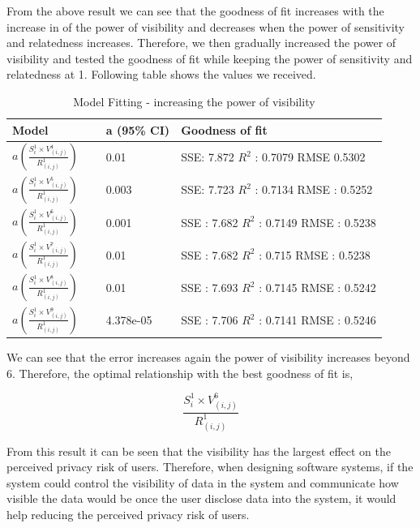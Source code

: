 \documentclass[conference]{IEEEtran}
\begin{document}
From the above result we can see that the goodness of fit increases with the increase in of the power of visibility and decreases when the power of sensitivity and relatedness increases. Therefore, we then gradually increased the power of visibility and tested the goodness of fit while keeping the power of sensitivity and relatedness at 1. Following table shows the values we received.
\begin{center}
\begin{table}[htbp]
\caption{Model Fitting - increasing the power of visibility}
\begin{center}
\begin{adjustbox}{width=0.5\textwidth} 
\begin{tabular}{|p{0.25\linewidth}|p{0.2\linewidth}|p{0.55\linewidth}|} 
\hline
Model & a (95\% CI) & Goodness of fit\\
\hline
 $a(  \frac{S_{i}^1 \times V_{(i,j)}^4}{R_{(i,j)}^1})$ & 0.01 &  SSE: 7.872   $R^2$ : 0.7079  RMSE 0.5302\\
\hline
 $a(  \frac{S_{i}^1 \times V_{(i,j)}^5}{R_{(i,j)}^1}) $ & 0.003 & SSE: 7.723 $R^2$ : 0.7134  RMSE : 0.5252 \\
\hline
$a(  \frac{S_{i}^1 \times V_{(i,j)}^6}{R_{(i,j)}^1})$ & 0.001 & SSE : 7.682  $R^2$ : 0.7149  RMSE : 0.5238 \\
\hline
$a(  \frac{S_{i}^1 \times V_{(i,j)}^7}{R_{(i,j)}^1})$ & 0.01 &   SSE : 7.682  $R^2$ : 0.715  RMSE : 0.5238 \\
\hline
$a(  \frac{S_{i}^1 \times V_{(i,j)}^8}{R_{(i,j)}^1})$ & 0.01 & SSE : 7.693  $R^2$ : 0.7145  RMSE : 0.5242 \\
\hline
$a(  \frac{S_{i}^1 \times V_{(i,j)}^9}{R_{(i,j)}^1})$ & 4.378e-05  & SSE : 7.706  $R^2$  : 0.7141  RMSE : 0.5246 \\
\hline
\end{tabular}
\end{adjustbox}
\end{center}
\end{table}
\end{center}

We can see that the error increases again the power of visibility increases beyond 6. Therefore, the optimal relationship with the best goodness of fit is,

\[
\frac{S_{i}^1 \times V_{(i,j)}^6}{R_{(i,j)}^1}
\]

From this result it can be seen that the visibility has the largest effect on the perceived privacy risk of users. Therefore, when designing software systems, if the system could control the visibility of data in the system and communicate how visible the data would be once the user disclose data into the system, it would help reducing the perceived privacy risk of users. 
\end{document}
